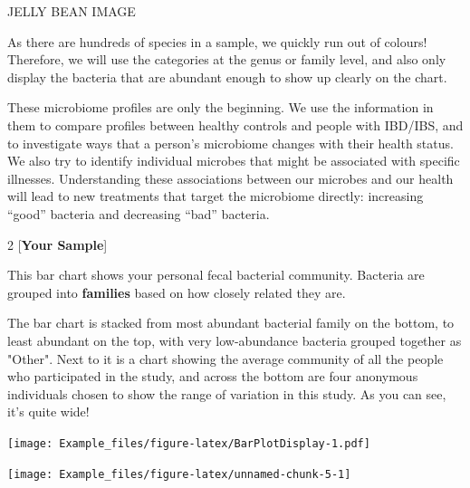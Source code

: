 \documentclass[
]{article}
\begin{document}
JELLY BEAN IMAGE

As there are hundreds of species in a sample, we quickly run out of
colours! Therefore, we will use the categories at the genus or family
level, and also only display the bacteria that are abundant enough to
show up clearly on the chart.

These microbiome profiles are only the beginning. We use the information
in them to compare profiles between healthy controls and people with
IBD/IBS, and to investigate ways that a person's microbiome changes with
their health status. We also try to identify individual microbes that
might be associated with specific illnesses. Understanding these
associations between our microbes and our health will lead to new
treatments that target the microbiome directly: increasing ``good''
bacteria and decreasing ``bad'' bacteria.

\newpage

\vspace*{\fill}

\begin{multicols}{2}
[\textbf{Your Sample}]

\begin{small}
This bar chart shows your personal fecal bacterial community. 
Bacteria are grouped into \textbf{families} based on how closely related
they are.

The bar chart is stacked from most abundant bacterial family on the 
bottom, to least abundant on the top, with very low-abundance 
bacteria grouped together as "Other". Next to it is a chart showing
the average community of all the people who participated in the study,
and across the bottom are four anonymous individuals chosen to show
the range of variation in this study. As you can see, it's quite wide!
\end{small}
\columnbreak

\texttt{[image: Example\_files/figure-latex/BarPlotDisplay-1.pdf]}

\end{multicols}

\begin{center}\texttt{[image: Example\_files/figure-latex/unnamed-chunk-5-1]} \end{center}
\vspace*{\fill}
\newpage
\end{document}
